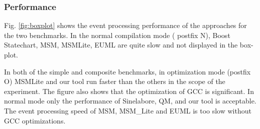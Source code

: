 \subsubsection{Performance} 
Fig. \ref{fig:boxplot} shows the event processing performance of the approaches for the two benchmarks.
In the normal compilation mode ( postfix N), Boost Statechart, MSM, MSMLite, EUML are quite slow and not displayed in the box-plot. 
  

In both of the simple and composite benchmarks, in optimization mode (postfix O) MSMLite and our tool run faster than the others in the scope of the experiment.
The figure also shows that the optimization of GCC is significant.
In normal mode only the performance of Sinelabore, QM, and our tool is acceptable. 
The event processing speed of MSM, MSM\_Lite and EUML is too slow without GCC optimizations. 


